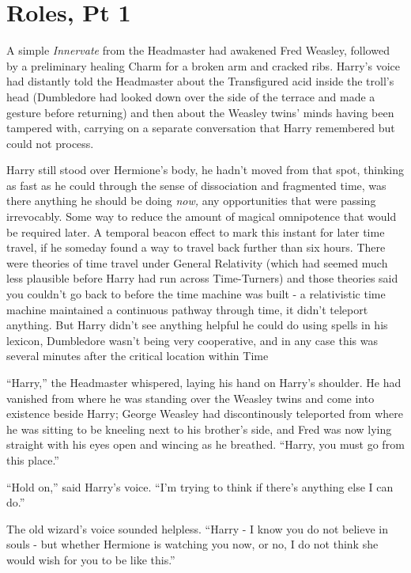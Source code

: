 \chapter{Roles, Pt 1}

A simple \emph{Innervate} from the Headmaster had awakened Fred Weasley,
followed by a preliminary healing Charm for a broken arm and cracked
ribs. Harry's voice had distantly told the Headmaster about the
Transfigured acid inside the troll's head (Dumbledore had looked down
over the side of the terrace and made a gesture before returning) and
then about the Weasley twins' minds having been tampered with, carrying
on a separate conversation that Harry remembered but could not process.

Harry still stood over Hermione's body, he hadn't moved from that spot,
thinking as fast as he could through the sense of dissociation and
fragmented time, was there anything he should be doing \emph{now,} any
opportunities that were passing irrevocably. Some way to reduce the
amount of magical omnipotence that would be required later. A temporal
beacon effect to mark this instant for later time travel, if he someday
found a way to travel back further than six hours. There were theories
of time travel under General Relativity (which had seemed much less
plausible before Harry had run across Time-Turners) and those theories
said you couldn't go back to before the time machine was built - a
relativistic time machine maintained a continuous pathway through time,
it didn't teleport anything. But Harry didn't see anything helpful he
could do using spells in his lexicon, Dumbledore wasn't being very
cooperative, and in any case this was several minutes after the critical
location within Time

``Harry,'' the Headmaster whispered, laying his hand on Harry's
shoulder. He had vanished from where he was standing over the Weasley
twins and come into existence beside Harry; George Weasley had
discontinously teleported from where he was sitting to be kneeling next
to his brother's side, and Fred was now lying straight with his eyes
open and wincing as he breathed. ``Harry, you must go from this place.''

``Hold on,'' said Harry's voice. ``I'm trying to think if there's
anything else I can do.''

The old wizard's voice sounded helpless. ``Harry - I know you do not
believe in souls - but whether Hermione is watching you now, or no, I do
not think she would wish for you to be like this.''

